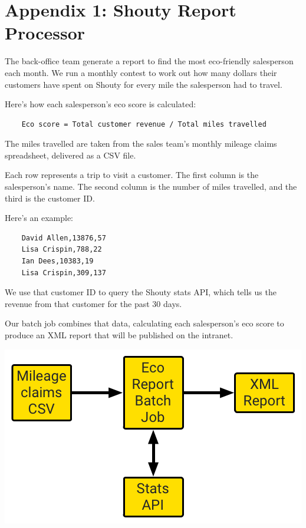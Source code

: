 \chapter*{Appendix 1: Shouty Report Processor}

The back-office team generate a report to find the most eco-friendly salesperson each month. We run a monthly contest to work out how many dollars their customers have spent on Shouty for every mile the salesperson had to travel. 

Here's how each salesperson's eco score is calculated:

\begin{verbatim}
    Eco score = Total customer revenue / Total miles travelled
\end{verbatim}

The miles travelled are taken from the sales team's monthly mileage claims spreadsheet, delivered as a CSV file.

Each row represents a trip to visit a customer. The first column is the salesperson's name. The second column is the number of miles travelled, and the third is the customer ID.

Here's an example:

\begin{verbatim}
    David Allen,13876,57
    Lisa Crispin,788,22
    Ian Dees,10383,19
    Lisa Crispin,309,137
\end{verbatim}

We use that customer ID to query the Shouty stats API, which tells us the revenue from that customer for the past 30 days.

Our batch job combines that data, calculating each salesperson's eco score to produce an XML report that will be published on the intranet.

\includegraphics[width=\textwidth]{images/shouty-report-processor-overview-diagram}